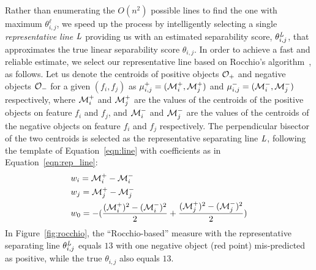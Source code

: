  Rather than enumerating the $O(n^2)$ possible lines to find the one with maximum $\theta_{i,j}^{\ell}$, we speed up the process by intelligently selecting a single {\em representative line} $\mathit{L}$ providing us with an estimated separability score, $\theta_{i,j}^{\mathit{L}}$, that approximates the true linear separability score $\theta_{i, j}$.
In order to achieve a fast and reliable estimate, we select our representative line based on Rocchio's algorithm~\cite{rocchio1971relevance}, as follows.
Let us denote the centroids of positive objects ${\mathcal{O}}_+$ and negative objects ${\mathcal{O}}_-$ for a given $(f_i,f_j)$ as $\mu_{i,j}^+=({\mathcal{M}}_i^+,{\mathcal{M}}_j^+)$ and $\mu_{i,j}^-=({\mathcal{M}}_i^-,{\mathcal{M}}_j^-)$ respectively, where ${\mathcal{M}}_i^+$ and ${\mathcal{M}}_j^+$ are the values of the centroids of the positive objects on feature $f_i$ and $f_j$, and ${\mathcal{M}}_i^-$ and ${\mathcal{M}}_j^-$ are the values of the centroids of the negative objects on feature $f_i$ and $f_j$ respectively. The perpendicular bisector of the two centroids is selected as the representative separating line $\mathit{L}$, following the template of Equation~\ref{eqn:line} with coefficients as in Equation~\ref{eqn:rep_line}:
\begin{equation}\label{eqn:rep_line}
\begin{split}
& w_i = {\mathcal{M}}_i^+-{\mathcal{M}}_i^- \\
& w_j = {\mathcal{M}}_j^+-{\mathcal{M}}_j^- \\
& w_0 = -(\frac{({\mathcal{M}}_i^+)^2-({\mathcal{M}}_i^-)^2}{2}+\frac{({\mathcal{M}}_j^+)^2-({\mathcal{M}}_j^-)^2}{2})
\end{split}
\end{equation}
\noindent In Figure~\ref{fig:rocchio}, the ``Rocchio-based'' measure with the representative separating line $\theta_{i,j}^{\mathit{L}}$ equals $13$ with one negative object (red point) mis-predicted as positive, while the true $\theta_{i,j}$ also equals $13$.

